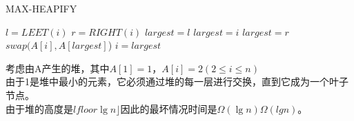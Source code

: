 \documentclass[a4paper, justified]{tufte-handout}
\begin{document}
\begin{problem}[TC 6.2-5]
\end{problem}

\begin{solution}
  \begin{algorithm}[H]
    \caption{MAX-HEAPIFY}
    \begin{algorithmic}[1]
      \State $l = LEET(i)$
      \State $r = RIGHT(i)$
      \State $largest = l$
      \Else $largest = i$
      \EndIf
      \State $largest = r$
      \EndIf
      \State \Return
      \EndIf
      \State $swap(A[i], A[largest]$)
      \State $i = largest$
      \EndWhile
      \EndProcedure
    \end{algorithmic}
  \end{algorithm}
\end{solution}

\begin{problem}[TC 6.2-6]
\end{problem}

\begin{solution}
  考虑由A产生的堆，其中$A[1]=1，A[i]=2(2 \leq i \leq n)$\\
  由于1是堆中最小的元素，它必须通过堆的每一层进行交换，直到它成为一个叶子节点。\\
  由于堆的高度是$lfloor \lg n\rfloor$因此的最坏情况时间是$\Omega(\lg n)Ω(lgn)$。
\end{solution}

\begin{problem}[TC 6.3-3]
\end{problem}
\end{document}
